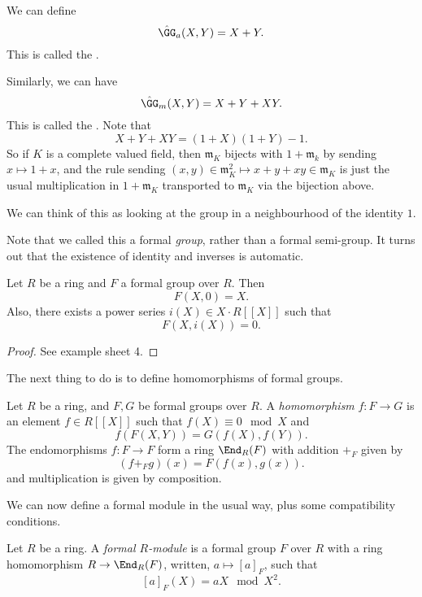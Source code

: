 \documentclass[a4paper]{article}
\begin{document}
\begin{eg}
  We can define
  \[
    \hat{\GG}_a(X, Y) = X + Y.
  \]
  This is called the .

  Similarly, we can have
  \[
    \hat{\GG}_m(X, Y) = X + Y + XY.
  \]
  This is called the . Note that
  \[
    X + Y + XY = (1 + X)(1 + Y) - 1.
  \]
  So if $K$ is a complete valued field, then $\mathfrak{m}_K$ bijects with $1 + \mathfrak{m}_k$ by sending $x \mapsto 1 + x$, and the rule sending $(x, y) \in \mathfrak{m}_K^2 \mapsto x + y + xy \in \mathfrak{m}_K$ is just the usual multiplication in $1 + \mathfrak{m}_K$ transported to $\mathfrak{m}_K$ via the bijection above.

  We can think of this as looking at the group in a neighbourhood of the identity $1$.
\end{eg}

Note that we called this a formal \emph{group}, rather than a formal semi-group. It turns out that the existence of identity and inverses is automatic.
\begin{lemma}
  Let $R$ be a ring and $F$ a formal group over $R$. Then
  \[
    F(X, 0) = X.
  \]
  Also, there exists a power series $i(X) \in X \cdot R[[X]]$ such that
  \[
    F(X, i(X)) = 0.
  \]
\end{lemma}

\begin{proof}
  See example sheet 4. %
\end{proof}

The next thing to do is to define homomorphisms of formal groups.

\begin{defi}
  Let $R$ be a ring, and $F, G$ be formal groups over $R$. A \emph{homomorphism} $f: F \to G$ is an element $f \in R[[X]]$ such that $f(X) \equiv 0 \mod X$ and
  \[
    f(F(X, Y)) = G(f(X), f(Y)).
  \]
  The endomorphisms $f: F \to F$ form a ring $\End_R(F)$ with addition $+_F$ given by
  \[
    (f +_F g)(x) = F(f(x), g(x)).
  \]
  and multiplication is given by composition.
\end{defi}

We can now define a formal module in the usual way, plus some compatibility conditions.
\begin{defi}
  Let $R$ be a ring. A \emph{formal $R$-module} is a formal group $F$ over $R$ with a ring homomorphism $R \to \End_{R}(F)$, written, $a \mapsto [a]_F$, such that
  \[
    [a]_F(X) = aX \mod X^2.
  \]
\end{defi}
\end{document}
